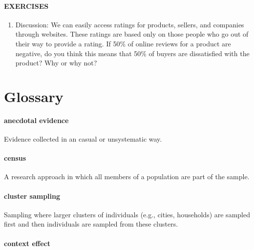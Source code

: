 \documentclass[
]{krantz}
\providecommand{\tightlist}{%
  \setlength{\itemsep}{0pt}\setlength{\parskip}{0pt}}
\begin{document}
\hypertarget{exercises-16}{%
\paragraph*{EXERCISES}\label{exercises-16}}

\begin{enumerate}
\def\labelenumi{\arabic{enumi}.}
\tightlist
\item
  Discussion: We can easily access ratings for products, sellers, and companies through websites. These ratings are based only on those people who go out of their way to provide a rating. If 50\% of online reviews for a product are negative, do you think this means that 50\% of buyers are dissatisfied with the product? Why or why not?
\end{enumerate}

\hypertarget{glossary-6}{%
\section{Glossary}\label{glossary-6}}

\hypertarget{anecdotal-evidence-1}{%
\paragraph*{anecdotal evidence}\label{anecdotal-evidence-1}}

Evidence collected in an casual or unsystematic way.

\hypertarget{census}{%
\paragraph*{census}\label{census}}

A research approach in which all members of a population are part of the sample.

\hypertarget{cluster-sampling}{%
\paragraph*{cluster sampling}\label{cluster-sampling}}

Sampling where larger clusters of individuals (e.g., cities, households) are sampled first and then individuals are sampled from these clusters.

\hypertarget{context-effect-1}{%
\paragraph*{context effect}\label{context-effect-1}}
\end{document}
